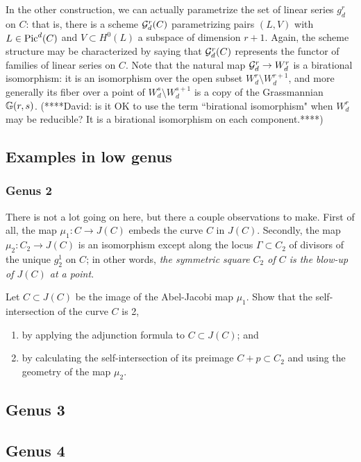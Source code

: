 In the other construction, we can actually parametrize the set of linear series $g^r_d$ on $C$: that is, there is a scheme $\cG^r_d(C)$ parametrizing pairs $(L, V)$ with $L \in \Pic^d(C)$ and $V \subset H^0(L)$ a subspace of dimension $r+1$. Again, the scheme structure may be characterized by saying that $\cG^r_d(C)$ represents the functor of families of linear series on $C$. Note that the natural map $\cG^r_d \to W^r_d$ is a birational isomorphism: it is an isomorphism over the open subset $W^r_d \setminus W^{r+1}_d$, and more generally its fiber over a point of $W^s_d \setminus W^{s+1}_d$ is a copy of  the Grassmannian $\GG(r, s)$. (****David: is it OK to use the term ``birational isomorphism" when $W^r_d$ may be reducible? It is a birational isomorphism on each component.****)

\subsection{Examples in low genus}

\subsubsection{Genus 2} There is not a lot going on here, but there a couple observations to make. First of all, the map $\mu_1 : C \to J(C)$ embeds the curve $C$ in $J(C)$. Secondly, the map $\mu_2 : C_2 \to J(C)$ is an isomorphism except along the locus $\Gamma \subset C_2$ of divisors of the unique $g^1_2$ on $C$; in other words, \emph{the symmetric square $C_2$ of $C$ is the blow-up of $J(C)$ at a point}.

\begin{exercise}
Let $C \subset J(C)$ be the image of the Abel-Jacobi map $\mu_1$. Show that the self-intersection of the curve $C$ is 2,
\begin{enumerate}
\item by applying the adjunction formula to $C \subset J(C)$; and
\item by calculating the self-intersection of its preimage $C + p \subset C_2$ and using the geometry of the map $\mu_2$.
\end{enumerate}
\end{exercise}

\subsection{Genus 3}


\subsection{Genus 4}

